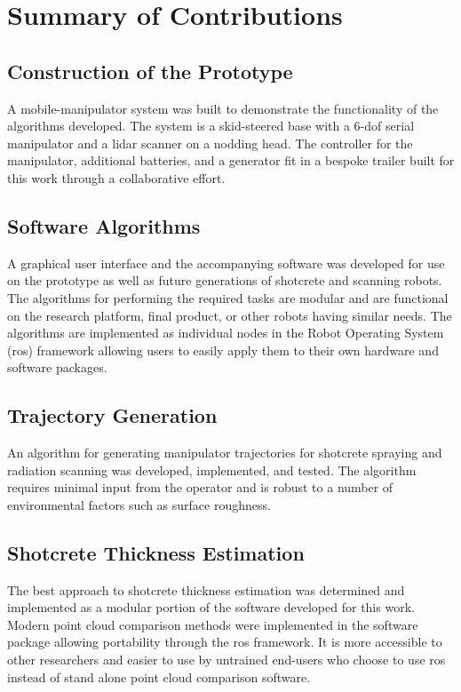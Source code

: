 \section{Summary of Contributions}
\label{sec:contributions}

\subsection{Construction of the Prototype}
A mobile-manipulator system was built to demonstrate the functionality of the algorithms developed. The system is a skid-steered base with a 6-\acrshort{dof} serial manipulator and a \acrshort{lidar} scanner on a nodding head. The controller for the manipulator, additional batteries, and a generator fit in a bespoke trailer built for this work through a collaborative effort.\\

\subsection{Software Algorithms}
A graphical user interface and the accompanying software was developed for use on the prototype as well as future generations of shotcrete and scanning robots. The algorithms for performing the required tasks are modular and are functional on the research platform, final product, or other robots having similar needs. The algorithms are implemented as individual nodes in the Robot Operating System (\acrshort{ros}) framework allowing users to easily apply them to their own hardware and software packages.\\

\subsection{Trajectory Generation}
An algorithm for generating manipulator trajectories for shotcrete spraying and radiation scanning was developed, implemented, and tested. The algorithm requires minimal input from the operator and is robust to a number of environmental factors such as surface roughness.\\

\subsection{Shotcrete Thickness Estimation}
The best approach to shotcrete thickness estimation was determined and implemented as a modular portion of the software developed for this work. Modern point cloud comparison methods were implemented in the software package allowing portability through the \acrshort{ros} framework. It is more accessible to other researchers and easier to use by untrained end-users who choose to use \acrshort{ros} instead of stand alone point cloud comparison software.

